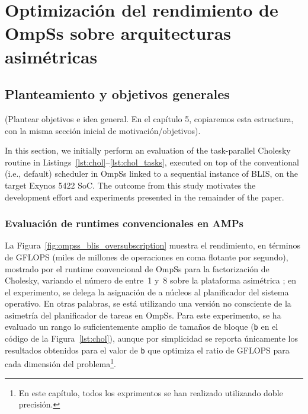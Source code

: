 \cleardoublepage

\chapter{Optimización del rendimiento de OmpSs sobre arquitecturas asimétricas}
\label{ch:chapter4}

%
%
%
%
\section{Planteamiento y objetivos generales}

(Plantear objetivos e idea general. En el capítulo 5, copiaremos esta estructura, con la
misma sección inicial de motivación/objetivos).

In this section, we initially perform an evaluation 
of the task-parallel Cholesky routine in Listings~\ref{lst:chol}--\ref{lst:chol_tasks},
executed on top of the conventional (i.e., default) scheduler in 
OmpSs linked to a sequential instance of BLIS,  on the target Exynos 5422 SoC.  The outcome from this study 
motivates the development effort and experiments presented in the remainder of the paper.

\subsection{Evaluación de runtimes convencionales en AMPs}

La Figura~\ref{fig:ompss_blis_oversubscription} muestra el rendimiento, en términos de GFLOPS (miles de millones de
operaciones en coma flotante por segundo), mostrado por el runtime convencional de OmpSs para la factorización
de Cholesky, variando el número de \wts entre~1 y~8 sobre la plataforma asimétrica \odroid; en el 
experimento, se delega la asignación de \wts a núcleos al planificador del sistema operativo. En otras palabras,
se está utilizando una versión no consciente de la asimetría del planificador de tareas en OmpSs.
Para este experimento, se ha evaluado un rango lo suficientemente amplio de tamaños de bloque 
({\tt b} en el código de la Figura~\ref{lst:chol}), aunque por simplicidad se reporta únicamente los
resultados obtenidos para el valor de {\tt b} que optimiza el ratio de GFLOPS para cada dimensión
del problema\footnote{En este capítulo, todos los exprimentos se han realizado utilizando doble precisión.}.

